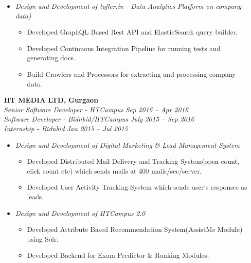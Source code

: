 \documentclass[margin,line]{resume}
\begin{document}
\begin{resume}
\begin{itemize}
     \item \textsl{Design and Development of tofler.in - Data Analytics Platform on company data) }
        \begin{itemize}
            \item Developed GraphQL Based Rest API and ElasticSearch query builder.
            \item Developed Continuous Integration Pipeline for running tests and generating docs.
            \item Build Crawlers and Processors for extracting and processing company data.
           
        \end{itemize}
    \end{itemize}
    
    \textbf{HT MEDIA LTD, Gurgaon}\\
           \textsl{Senior Software Developer - HTCampus} \hfill \textsl{Sep 2016 -- Apr 2016} \vspace{0mm}\\\vspace{0mm}%
           \textsl{Software Developer - Bidnbid/HTCampus} \hfill \textsl{July 2015 -- Sep 2016} \vspace{0mm}\\\vspace{0mm}%
           \textsl{Internship - Bidnbid} \hfill \textsl{Jan 2015 -- Jul 2015} \vspace{0mm}\\\vspace{0mm}%
    \begin{itemize}
    
     \item \textsl{Design and Development of Digital Marketing \& Lead Management System}
        \begin{itemize}
            \item Developed Distributed Mail Delivery and Tracking System(open count, click count etc) which
sends mails at 400 mails/sec/server.
            \item Developed User Activity Tracking System  which sends user's responses as leads.
	
        \end{itemize}

    \item \textsl{Design and Development of HTCampus 2.0}
        \begin{itemize}
            \item Developed Attribute Based Recommendation System(AssistMe Module) using Solr.
            \item Developed Backend for Exam Predictor \& Ranking Modules.
        \end{itemize}



\end{itemize}
\end{resume}
\end{document}
